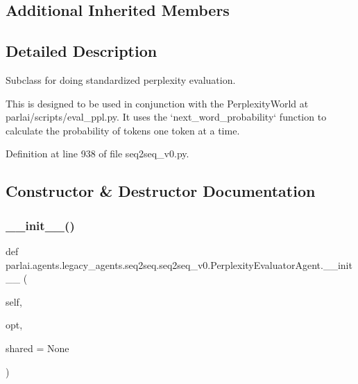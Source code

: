 \subsection*{Additional Inherited Members}


\subsection{Detailed Description}
\begin{DoxyVerb}Subclass for doing standardized perplexity evaluation.

This is designed to be used in conjunction with the PerplexityWorld at
parlai/scripts/eval_ppl.py. It uses the `next_word_probability` function
to calculate the probability of tokens one token at a time.
\end{DoxyVerb}
 

Definition at line 938 of file seq2seq\+\_\+v0.\+py.



\subsection{Constructor \& Destructor Documentation}
\mbox{\label{classparlai_1_1agents_1_1legacy__agents_1_1seq2seq_1_1seq2seq__v0_1_1PerplexityEvaluatorAgent_a6d6f4af5d475bea076503cd83c5ce502}} 
\subsubsection{\texorpdfstring{\+\_\+\+\_\+init\+\_\+\+\_\+()}{\_\_init\_\_()}}
{\footnotesize\ttfamily def parlai.\+agents.\+legacy\+\_\+agents.\+seq2seq.\+seq2seq\+\_\+v0.\+Perplexity\+Evaluator\+Agent.\+\_\+\+\_\+init\+\_\+\+\_\+ (\begin{DoxyParamCaption}\item[{}]{self,  }\item[{}]{opt,  }\item[{}]{shared = {\ttfamily None} }\end{DoxyParamCaption})}



